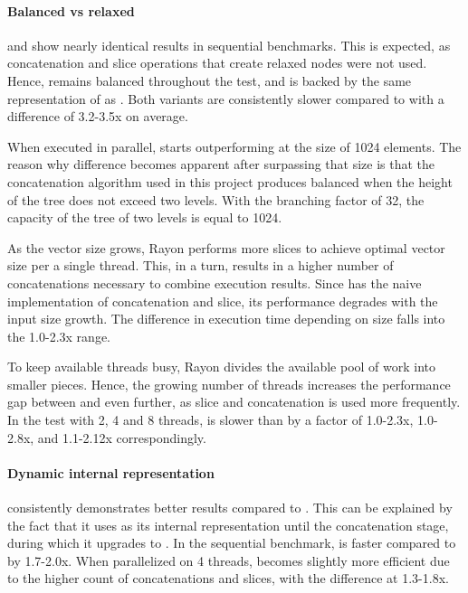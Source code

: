 
\paragraph{Balanced vs relaxed}
\rbvec{} and \rrbvec{} show nearly identical results in sequential benchmarks. This is expected, as concatenation and slice operations that create relaxed nodes were not used. Hence, \rrbvec{} remains balanced throughout the test, and is backed by the same representation of \rrbtree{} as \rbvec{}. Both variants are consistently slower compared to \stdvec{} with a difference of 3.2-3.5x on average. 

When executed in parallel, \rrbvec{} starts outperforming \rbvec{} at the size of 1024 elements. The reason why difference becomes apparent after surpassing that size is that the concatenation algorithm used in this project produces balanced \rbtree{} when the height of the tree does not exceed two levels. With the branching factor of 32, the capacity of the tree of two levels is equal to 1024. 

As the vector size grows, Rayon performs more slices to achieve optimal vector size per a single thread. This, in a turn, results in a higher number of concatenations necessary to combine execution results. Since \rbvec{} has the naive implementation of concatenation and slice, its performance degrades with the input size growth. The difference in execution time depending on size falls into the 1.0-2.3x range. 

To keep available threads busy, Rayon divides the available pool of work into smaller pieces. Hence, the growing number of threads increases the performance gap between \rbvec{} and \rrbvec{} even further, as slice and concatenation is used more frequently. In the test with 2, 4 and 8 threads, \rbvec{} is slower than \rrbvec{} by a factor of 1.0-2.3x, 1.0-2.8x, and 1.1-2.12x correspondingly. 

\paragraph{Dynamic internal representation}
\pvec{} consistently demonstrates better results compared to \rrbvec{}. This can be explained by the fact that it uses \stdvec{} as its internal representation until the concatenation stage, during which it upgrades to \rrbvec{}. In the sequential benchmark, \pvec{} is faster compared to \rrbvec{} by 1.7-2.0x. When parallelized on 4 threads, \rrbvec{} becomes slightly more efficient due to the higher count of concatenations and slices, with the difference at 1.3-1.8x. 

